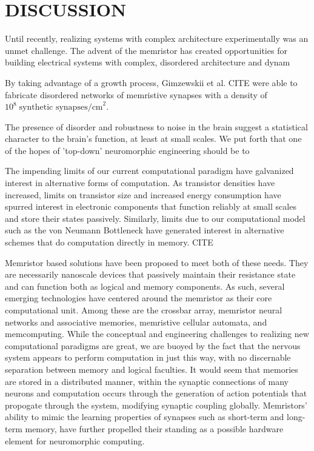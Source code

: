 \documentclass[aps,prl,preprint,groupedaddress]{revtex4-1}
\begin{document}
\section{DISCUSSION}


Until recently, realizing systems with complex architecture
experimentally was an unmet challenge.  The advent of the memristor has
created opportunities for building electrical systems with complex, disordered
architecture and dynam

By taking advantage of a growth process, Gimzewskii et
al. CITE were able to fabricate disordered networks of memristive synapses
with a density of $10^8\; \text{synthetic synapses/cm}^2$.

The presence of disorder and robustness to noise in the brain
suggest a statistical character to the brain's function, at least at small
scales.  We put forth that one of the hopes of 'top-down' neuromorphic
engineering should be to 

The impending limits of our current computational paradigm have galvanized
interest in alternative forms of computation. As transistor densities have
increased, limits on transistor size and increased energy consumption have
spurred interest in electronic components that function reliably at small
scales and store their states passively.  Similarly, limits due to our
computational model such as the von Neumann Bottleneck have generated
interest in alternative schemes that do computation directly in memory.
CITE

Memristor based solutions have been proposed to meet both of these needs.
They are
necessarily nanoscale devices that passively maintain their resistance
state and can function both as logical and memory components.  As such,
several emerging technologies have centered around the memristor as
their core computational unit.  Among these are the crossbar array,
memristor neural networks and associative memories, memristive cellular
automata, and memcomputing.  While the conceptual and engineering
challenges to realizing new computational paradigms are great, we are
buoyed by the fact that the nervous system appears to perform computation
in just this way, with no discernable separation between memory and
logical faculties.  It would seem that memories are stored in a
distributed manner, within the synaptic connections of many neurons
and computation occurs through the generation of action potentials that
propogate through the system, modifying synaptic coupling globally.
Memristors' ability to mimic the learning properties of synapses such as
short-term and long-term memory, have further propelled their standing as
a possible hardware element for neuromorphic computing.
\end{document}

